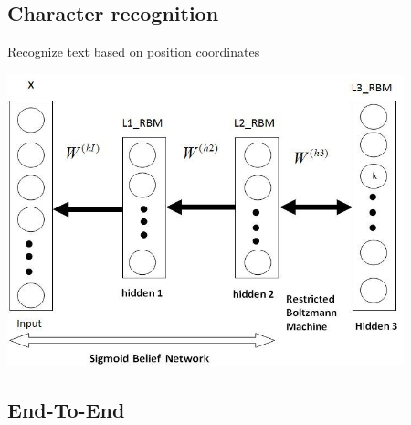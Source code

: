 \subsection{Character recognition}
Recognize text based on position coordinates
\begin{center}
    \includegraphics[width=\textwidth]{img/Deep-Belief-Network.png}
\end{center}

\subsection{End-To-End}
